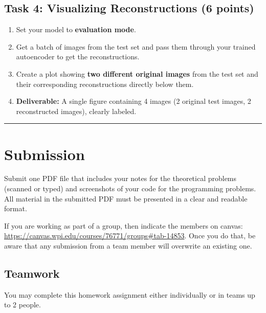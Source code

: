 \documentclass[
  letterpaper,
  DIV=11,
  numbers=noendperiod]{scrartcl}
\providecommand{\tightlist}{%
  \setlength{\itemsep}{0pt}\setlength{\parskip}{0pt}}\usepackage{longtable,booktabs,array}
\begin{document}
\subsection{Task 4: Visualizing Reconstructions (6
points)}\label{task-4-visualizing-reconstructions-6-points}

\begin{enumerate}
\def\labelenumi{\arabic{enumi}.}
\tightlist
\item
  Set your model to \textbf{evaluation mode}.
\item
  Get a batch of images from the test set and pass them through your
  trained autoencoder to get the reconstructions.
\item
  Create a plot showing \textbf{two different original images} from the
  test set and their corresponding reconstructions directly below them.
\item
  \textbf{Deliverable:} A single figure containing 4 images (2 original
  test images, 2 reconstructed images), clearly labeled.
\end{enumerate}

\begin{center}\rule{0.5\linewidth}{0.5pt}\end{center}

\section{Submission}\label{submission}

Submit one PDF file that includes your notes for the theoretical
problems (scanned or typed) and screenshots of your code for the
programming problems. All material in the submitted PDF must be
presented in a clear and readable format.

If you are working as part of a group, then indicate the members on
canvas:
\href{https://www.google.com/search?q=https://canvas.wpi.edu/courses/76771/groups\%23tab-14853}{https://canvas.wpi.edu/courses/76771/groups\#tab-14853}.
Once you do that, be aware that any submission from a team member will
overwrite an existing one.

\subsection{Teamwork}\label{teamwork}

You may complete this homework assignment either individually or in
teams up to 2 people.
\end{document}
